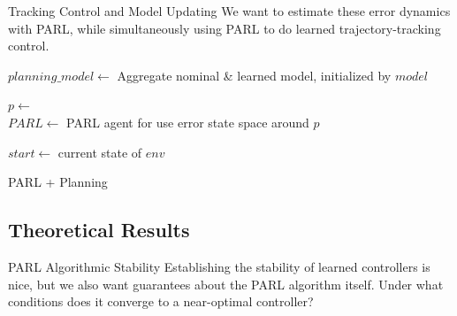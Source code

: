 \documentclass{beamer}
\begin{document}
\begin{frame}{Tracking Control and Model Updating}
  We want to estimate these error dynamics with PARL, while simultaneously
  using PARL to do learned trajectory-tracking control.

  \begin{center}
  \scalebox{0.7} {
    \begin{algorithm}[H]
      \DontPrintSemicolon
      

      \BlankLine
      $planning\_model \leftarrow$ Aggregate nominal \& learned model, initialized by $model$ \\
       {
          $p \leftarrow$  \\
          $PARL \leftarrow$ PARL agent for use error state space around $p$ \\
          
          
          $start \leftarrow$ current state of $env$ \\
      }
      \caption{PARL + Planning}
      \label{alg:parl_planning}
  \end{algorithm}
  }
  \end{center}
\end{frame}

\subsection{Theoretical Results}

\begin{frame}{PARL Algorithmic Stability}
  Establishing the stability of learned controllers is nice, but we also want
  guarantees about the PARL algorithm itself. Under what conditions does it
  converge to a near-optimal controller? 
\end{frame}
\end{document}
